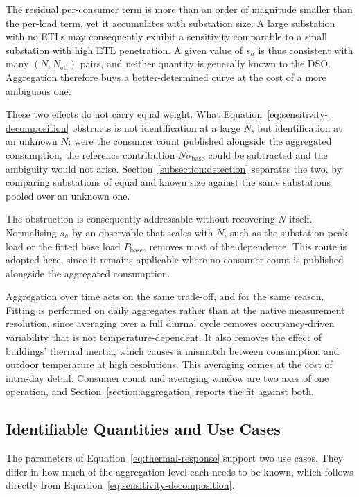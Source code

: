 \documentclass[9pt,journal,a4]{IEEEtran}
\begin{document}
The residual per-consumer term is more than an order of magnitude smaller than the per-load term, yet it accumulates with substation size. A large substation with no ETLs may consequently exhibit a sensitivity comparable to a small substation with high ETL penetration. A given value of $s_h$ is thus consistent with many $(N, N_{\mathrm{etl}})$ pairs, and neither quantity is generally known to the DSO. Aggregation therefore buys a better-determined curve at the cost of a more ambiguous one.

These two effects do not carry equal weight. What Equation~\eqref{eq:sensitivity-decomposition} obstructs is not identification at a large $N$, but identification at an unknown $N$: were the consumer count published alongside the aggregated consumption, the reference contribution $N \sigma_{\mathrm{base}}$ could be subtracted and the ambiguity would not arise. Section~\ref{subsection:detection} separates the two, by comparing substations of equal and known size against the same substations pooled over an unknown one.

The obstruction is consequently addressable without recovering $N$ itself. Normalising $s_h$ by an observable that scales with $N$, such as the substation peak load or the fitted base load $P_{\mathrm{base}}$, removes most of the dependence. This route is adopted here, since it remains applicable where no consumer count is published alongside the aggregated consumption.

Aggregation over time acts on the same trade-off, and for the same reason. Fitting is performed on daily aggregates rather than at the native measurement resolution, since averaging over a full diurnal cycle removes occupancy-driven variability that is not temperature-dependent. It also removes the effect of buildings' thermal inertia, which causes a mismatch between consumption and outdoor temperature at high resolutions. This averaging comes at the cost of intra-day detail. Consumer count and averaging window are two axes of one operation, and Section~\ref{section:aggregation} reports the fit against both.


\subsection{Identifiable Quantities and Use Cases}

The parameters of Equation~\eqref{eq:thermal-response} support two use cases. They differ in how much of the aggregation level each needs to be known, which follows directly from Equation~\eqref{eq:sensitivity-decomposition}.
\end{document}

